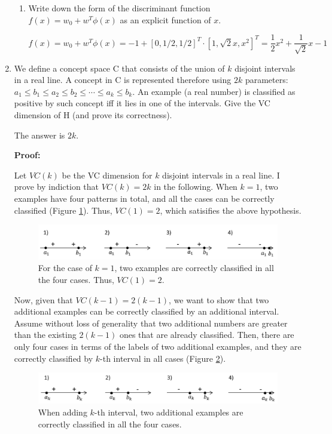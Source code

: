 \begin{enumerate}
\begin{enumerate}
\item Write down the form of the discriminant function $f(x)=w_0+w^T\phi(x)$ as an explicit function of $x$.

\[
f(x)=w_0 + w^T \phi(x)=-1 + [0, 1/2, 1/2]^T \cdot [1, \sqrt{2}x, x^2]^T=\frac{1}{2}x^2+\frac{1}{\sqrt{2}}x-1
\]

\end{enumerate}

\item We define a concept space C that consists of the union of $k$ disjoint intervals in a real line. A concept in C is represented therefore using $2k$ parameters: $a_1 \le b_1 \le a_2 \le b_2 \le \cdots \le a_k \le b_k$. An example (a real number) is classified as positive by such concept iff it lies in one of the intervals. Give the VC dimension of H (and prove its correctness).

The answer is $2k$.

{\bf Proof:}

Let $VC(k)$ be the VC dimension for $k$ disjoint intervals in a real line. I prove by indiction that $VC(k)=2k$ in the following. When $k=1$, two examples have four patterns in total, and all the cases can be correctly classified (Figure \ref{fig:vc_dimension1}). Thus, $VC(1)=2$, which satisifies the above hypothesis. 

\begin{figure}[hbtp]
\centering
\includegraphics[width=150mm]{vc_dimension1}
\caption{For the case of $k=1$, two examples are correctly classified in all the four cases. Thus, $VC(1)=2$.}
\label{fig:vc_dimension1}
\end{figure}

Now, given that $VC(k-1)=2(k-1)$, we want to show that two additional examples can be correctly classified by an additional interval. Assume without loss of generality that two additional numbers are greater than the existing $2(k-1)$ ones that are already classified. Then, there are only four cases in terms of the labels of two additional examples, and they are correctly classified by $k$-th interval in all cases (Figure \ref{fig:vc_dimension2}). 
\begin{figure}[hbtp]
\centering
\includegraphics[width=150mm]{vc_dimension2}
\caption{When adding $k$-th interval, two additional examples are correctly classified in all the four cases.}
\label{fig:vc_dimension2}
\end{figure}


\end{enumerate}

